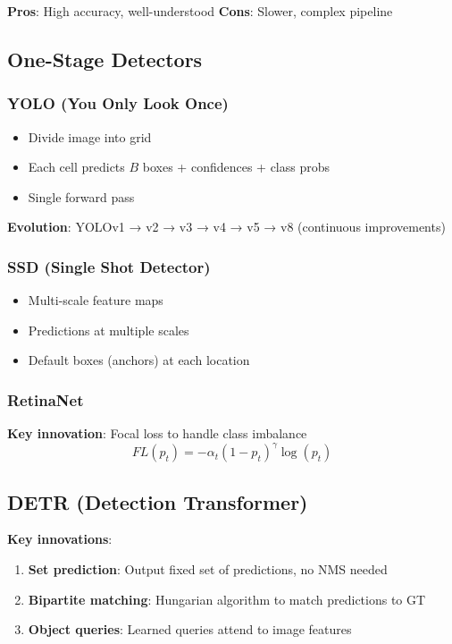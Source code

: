 \textbf{Pros}: High accuracy, well-understood
\textbf{Cons}: Slower, complex pipeline

\subsection{One-Stage Detectors}

\subsubsection{YOLO (You Only Look Once)}

\begin{itemize}
    \item Divide image into grid
    \item Each cell predicts $B$ boxes + confidences + class probs
    \item Single forward pass
\end{itemize}

\textbf{Evolution}: YOLOv1 → v2 → v3 → v4 → v5 → v8 (continuous improvements)

\subsubsection{SSD (Single Shot Detector)}

\begin{itemize}
    \item Multi-scale feature maps
    \item Predictions at multiple scales
    \item Default boxes (anchors) at each location
\end{itemize}

\subsubsection{RetinaNet}

\textbf{Key innovation}: Focal loss to handle class imbalance
\begin{equation}
FL(p_t) = -\alpha_t (1-p_t)^\gamma \log(p_t)
\end{equation}

\subsection{DETR (Detection Transformer)}

\textbf{Key innovations}:
\begin{enumerate}
    \item \textbf{Set prediction}: Output fixed set of predictions, no NMS needed
    \item \textbf{Bipartite matching}: Hungarian algorithm to match predictions to GT
    \item \textbf{Object queries}: Learned queries attend to image features
\end{enumerate}


